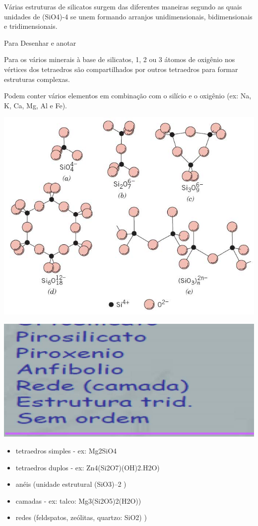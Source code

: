 Várias estruturas de silicatos surgem das diferentes maneiras segundo as quais unidades de (SiO4)-4 se unem formando arranjos unidimensionais, bidimensionais e tridimensionais.

Para Desenhar e anotar


Para os vários minerais à base de silicatos, 1, 2 ou 3 átomos de oxigênio nos vértices dos tetraedros são compartilhados por outros tetraedros para formar estruturas complexas.

Podem conter vários elementos em combinação com o silício e o oxigênio (ex: Na, K, Ca, Mg, Al e Fe).

 \includegraphics[scale=0.3,trim={0 0 0 0}]{figures/estsil}
  
 \includegraphics[scale=0.25,trim={0 0 0 0}]{figures/sil1}

\begin{itemize}
	\item tetraedros simples - ex: Mg2SiO4
	\item tetraedros duplos - ex: Zn4(Si2O7)(OH)2.H2O)
	\item anéis (unidade estrutural (SiO3)–2 )
	\item camadas - ex: talco: Mg3(Si2O5)2(H2O))
	\item redes (feldspatos, zeólitas, quartzo: SiO2) )
\end{itemize}

